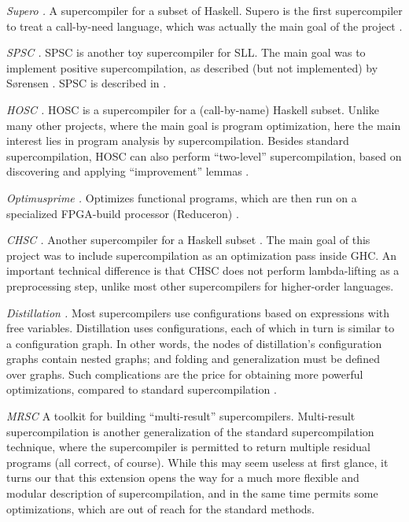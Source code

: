 \begin{longitem}
\item \emph{Supero \cite{SuperoUrl}.} A supercompiler for a subset of Haskell.
Supero is the first supercompiler to treat a call-by-need language,
which was actually the main goal of the 
project \cite{Mitchell2008taa,Mitchell2010Rethinking}.

\item \emph{SPSC \cite{SpscUrl}.} SPSC is another toy supercompiler for SLL.
The main goal was to implement positive supercompilation,
as described (but not implemented) by 
S{\o}rensen \cite{Sorensen1996Positive,Sorensen1998Introduction}. 
SPSC is described in \cite{Klyuchnikov2009SPSC}.

\item \emph{HOSC \cite{HoscUrl}.} HOSC is
a supercompiler for a (call-by-name) Haskell subset.
Unlike many other projects, where the main goal is program optimization,
here the main interest lies in program analysis by supercompilation.
Besides standard supercompilation, HOSC can also perform
``two-level'' supercompilation, based on discovering and applying 
``improvement'' lemmas \cite{Klyuchnikov2010Phd,Klyuchnikov2010Fast}.

\item \emph{Optimusprime \cite{OptimusprimeUrl}.} Optimizes
functional programs, which are then run on a specialized FPGA-build
processor (Reduceron) \cite{Reich2010Reduceron}.

\item \emph{CHSC \cite{ChscUrl}.} Another
supercompiler for a Haskell subset \cite{Bolingbroke2010Eval}.
The main goal of this project was to include supercompilation
as an optimization pass inside GHC.
An important technical difference is that CHSC does not perform
lambda-lifting as a preprocessing step, unlike most other
supercompilers for higher-order languages.

\item \emph{Distillation \cite{DistillUrl}.} Most
supercompilers use configurations based on expressions with free variables.
Distillation uses configurations, each of which in turn is 
similar to a configuration graph. 
In other words, the nodes of distillation's configuration graphs contain nested graphs;
and folding and generalization must be defined over graphs. 
Such complications are the price for obtaining more powerful
optimizations, compared to standard 
supercompilation \cite{Hamilton2007Distillation,Hamilton2010Graph}.

\item \emph{MRSC \cite{MrscUrl}} A toolkit 
for building ``multi-result'' supercompilers.
Multi-result supercompilation \cite{klyuchnikov2011mrsc} is another generalization of the standard
supercompilation technique, where the supercompiler is permitted to
return multiple residual programs (all correct, of course).
While this may seem useless at first glance, it turns our that 
this extension opens the way for a much more flexible and modular
description of supercompilation, and in the same time permits
some optimizations, which are out of reach for the standard methods.


\end{longitem}
